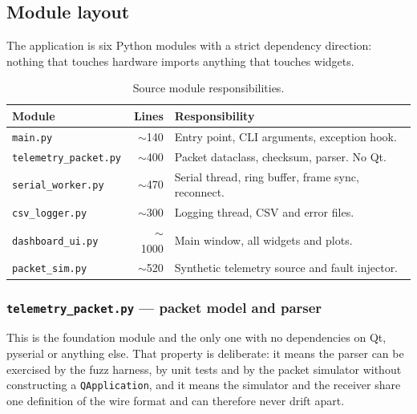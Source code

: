\documentclass[11pt,a4paper]{article}
\newcommand{\file}[1]{\texttt{#1}}
\newcommand{\code}[1]{\texttt{#1}}
\begin{document}
\subsection{Module layout}

The application is six Python modules with a strict dependency direction:
nothing that touches hardware imports anything that touches widgets.

\begin{table}[htbp]
\centering
\caption{Source module responsibilities.}
\label{tab:modules}
\small
\begin{tabular}{@{}lrp{78mm}@{}}
\toprule
\textbf{Module} & \textbf{Lines} & \textbf{Responsibility}\\
\midrule
\file{main.py}              & $\sim$140 & Entry point, CLI arguments, exception hook.\\
\file{telemetry\_packet.py} & $\sim$400 & Packet dataclass, checksum, parser. No Qt.\\
\file{serial\_worker.py}    & $\sim$470 & Serial thread, ring buffer, frame sync, reconnect.\\
\file{csv\_logger.py}       & $\sim$300 & Logging thread, CSV and error files.\\
\file{dashboard\_ui.py}     & $\sim$1000& Main window, all widgets and plots.\\
\file{packet\_sim.py}       & $\sim$520 & Synthetic telemetry source and fault injector.\\
\bottomrule
\end{tabular}
\end{table}

\subsubsection{\file{telemetry\_packet.py} --- packet model and parser}

This is the foundation module and the only one with no dependencies on Qt,
pyserial or anything else. That property is deliberate: it means the parser
can be exercised by the fuzz harness, by unit tests and by the packet
simulator without constructing a \code{QApplication}, and it means the
simulator and the receiver share one definition of the wire format and can
therefore never drift apart.
\end{document}
